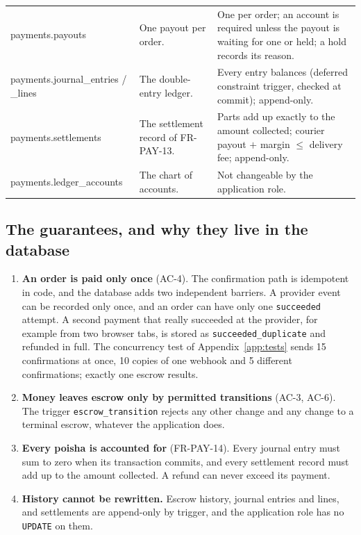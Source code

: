 \documentclass[11pt,a4paper]{article}
\newenvironment{dtable}[1]{\small\begin{longtable}{#1}}{\end{longtable}}
\begin{document}
\begin{dtable}{@{}>{\ttfamily\raggedright\arraybackslash}p{3.7cm}>{\raggedright\arraybackslash}p{4.9cm}>{\raggedright\arraybackslash}p{6.6cm}@{}}
payments.\allowbreak payouts & One payout per order. & One per order; an account is required unless the payout is waiting for one or held; a hold records its reason. \\
payments.\allowbreak journal\_entries / \_lines & The double-entry ledger. & Every entry balances (deferred constraint trigger, checked at commit); append-only. \\
payments.\allowbreak settlements & The settlement record of FR-PAY-13. & Parts add up exactly to the amount collected; courier payout $+$ margin $\le$ delivery fee; append-only. \\
payments.\allowbreak ledger\_accounts & The chart of accounts. & Not changeable by the application role. \\
\bottomrule
\end{dtable}

\subsection{The guarantees, and why they live in the database}
\begin{enumerate}[nosep]
  \item \textbf{An order is paid only once} (AC-4). The confirmation path is idempotent in code, and the database adds two independent barriers. A provider event can be recorded only once, and an order can have only one \texttt{succeeded} attempt. A second payment that really succeeded at the provider, for example from two browser tabs, is stored as \texttt{succeeded\_duplicate} and refunded in full. The concurrency test of Appendix~\ref{app:tests} sends 15 confirmations at once, 10 copies of one webhook and 5 different confirmations; exactly one escrow results.
  \item \textbf{Money leaves escrow only by permitted transitions} (AC-3, AC-6). The trigger \texttt{escrow\_transition} rejects any other change and any change to a terminal escrow, whatever the application does.
  \item \textbf{Every poisha is accounted for} (FR-PAY-14). Every journal entry must sum to zero when its transaction commits, and every settlement record must add up to the amount collected. A refund can never exceed its payment.
  \item \textbf{History cannot be rewritten.} Escrow history, journal entries and lines, and settlements are append-only by trigger, and the application role has no \texttt{UPDATE} on them.
\end{enumerate}
\end{document}
